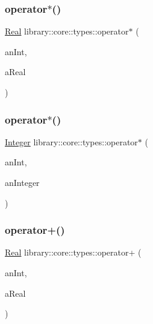 \subsubsection{\texorpdfstring{operator$\ast$()}{operator*()}\hspace{0.1cm}{\footnotesize\ttfamily [1/2]}}
{\footnotesize\ttfamily \hyperlink{classlibrary_1_1core_1_1types_1_1Real}{Real} library\+::core\+::types\+::operator$\ast$ (\begin{DoxyParamCaption}\item[{const \hyperlink{classlibrary_1_1core_1_1types_1_1Real_a9c5c8826b7e5a8e39544d23fea6c0e1c}{Real\+::\+Value\+Type} \&}]{an\+Int,  }\item[{const \hyperlink{classlibrary_1_1core_1_1types_1_1Real}{Real} \&}]{a\+Real }\end{DoxyParamCaption})}

\mbox{\label{namespacelibrary_1_1core_1_1types_abc5a3a409f7959b3f0130b2cbb7c3310}} 
\subsubsection{\texorpdfstring{operator$\ast$()}{operator*()}\hspace{0.1cm}{\footnotesize\ttfamily [2/2]}}
{\footnotesize\ttfamily \hyperlink{classlibrary_1_1core_1_1types_1_1Integer}{Integer} library\+::core\+::types\+::operator$\ast$ (\begin{DoxyParamCaption}\item[{const \hyperlink{classlibrary_1_1core_1_1types_1_1Integer_a623afb1580f870fd8a1997b1c12c917d}{Integer\+::\+Value\+Type} \&}]{an\+Int,  }\item[{const \hyperlink{classlibrary_1_1core_1_1types_1_1Integer}{Integer} \&}]{an\+Integer }\end{DoxyParamCaption})}

\mbox{\label{namespacelibrary_1_1core_1_1types_a6866c9236ccc6c22dd6d30e9b64d5aba}} 
\subsubsection{\texorpdfstring{operator+()}{operator+()}\hspace{0.1cm}{\footnotesize\ttfamily [1/2]}}
{\footnotesize\ttfamily \hyperlink{classlibrary_1_1core_1_1types_1_1Real}{Real} library\+::core\+::types\+::operator+ (\begin{DoxyParamCaption}\item[{const \hyperlink{classlibrary_1_1core_1_1types_1_1Real_a9c5c8826b7e5a8e39544d23fea6c0e1c}{Real\+::\+Value\+Type} \&}]{an\+Int,  }\item[{const \hyperlink{classlibrary_1_1core_1_1types_1_1Real}{Real} \&}]{a\+Real }\end{DoxyParamCaption})}


